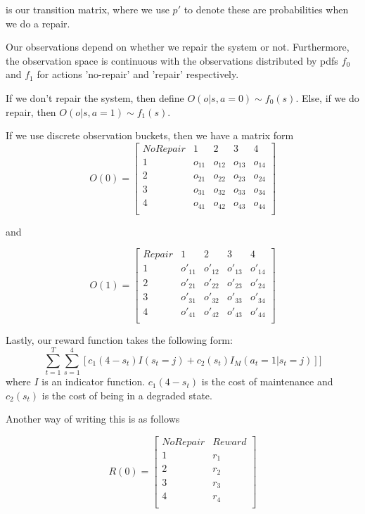 \documentclass[english]{article}
\numberwithin{equation}{section}
\begin{document}
	is our transition matrix, where we use $p'$ to denote these are probabilities when we do a repair.
	
	Our observations depend on whether we repair the system or not. Furthermore, the observation space is continuous with the observations distributed by pdfs $f_0$ and $f_1$ for actions 'no-repair' and 'repair' respectively.
	
	If we don't repair the system, then define $O(o|s,a=0) \sim f_0(s)$. Else, if we do repair, then $O(o|s,a=1) \sim f_1(s)$.
	
	If we use discrete observation buckets, then we have a matrix form
	$$    O(0) = 
	\begin{bmatrix}
	No Repair & 1 & 2 & 3 & 4 \\
	1 & o_{11} & o_{12} & o_{13} & o_{14} \\
	2 & o_{21} & o_{22} & o_{23} & o_{24} \\
	3 & o_{31} & o_{32} & o_{33} & o_{34} \\
	4 & o_{41} & o_{42} & o_{43} & o_{44} \\
	\end{bmatrix}
	$$
	
	and
	
	$$    O(1) = 
	\begin{bmatrix}
	Repair & 1 & 2 & 3 & 4 \\
	1 & o'_{11} & o'_{12} & o'_{13} & o'_{14} \\
	2 & o'_{21} & o'_{22} & o'_{23} & o'_{24} \\
	3 & o'_{31} & o'_{32} & o'_{33} & o'_{34} \\
	4 & o'_{41} & o'_{42} & o'_{43} & o'_{44} \\
	\end{bmatrix}
	$$
	
	Lastly, our reward function takes the following form:
	$$\sum_{t=1}^T \sum_{s=1}^4 [c_1(4-s_t)I(s_t=j) + c_2(s_t)I_M(a_t=1|s_t=j)]]$$
	where $I$ is an indicator function. $c_1(4-s_t)$ is the cost of maintenance and $c_2(s_t)$ is the cost of being in a degraded state.
	
	Another way of writing this is as follows
	
	$$
	R(0) = 
	\begin{bmatrix}
	No Repair & Reward \\
	1 & r_1 \\
	2 & r_2 \\
	3 & r_3 \\
	4 & r_4 \\
	\end{bmatrix}
	$$
	
\end{document}
